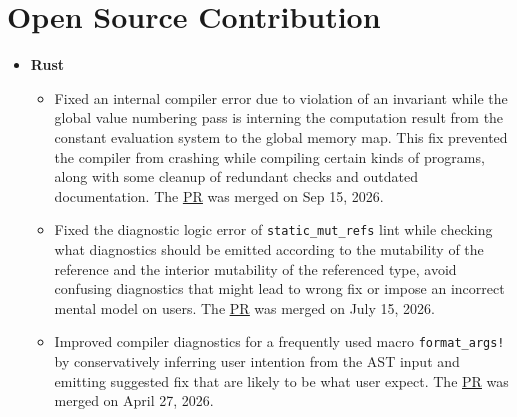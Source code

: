 \documentclass[letterpaper,11pt]{article}
\begin{document}
\section{Open Source Contribution}
\label{sec:osc}
\begin{itemize}[leftmargin=0.15in, label={}]
	\item \textbf{Rust}
	      \begin{itemize}[leftmargin=0.15in]
		      \item
		            Fixed an internal compiler error due to violation of an invariant while the global value numbering pass is interning
		            the computation result from the constant evaluation system to the global memory map.
		            This fix prevented the compiler from crashing while compiling certain kinds of programs, along with some cleanup of redundant checks and outdated documentation.
		            The \href{https://github.com/rust-lang/rust/pull/162463}{\underline{PR}} was merged on Sep 15, 2026.
		      \item
		            Fixed the diagnostic logic error of \texttt{static\_mut\_refs} lint while checking what diagnostics should
		            be emitted according to the mutability of the reference and the interior mutability of the
		            referenced type, avoid confusing diagnostics that might lead to wrong fix or impose an incorrect mental model on users.
		            The \href{https://github.com/rust-lang/rust/pull/159168}{\underline{PR}} was merged on July 15, 2026.
		      \item
		            Improved compiler diagnostics for a frequently used macro \texttt{format\_args!} by conservatively inferring
		            user intention from the AST input and emitting suggested fix that are likely to be what user expect.
		            The \href{https://github.com/rust-lang/rust/pull/155693}{\underline{PR}} was merged on April 27, 2026.

	      \end{itemize}
\end{itemize}
\end{document}
